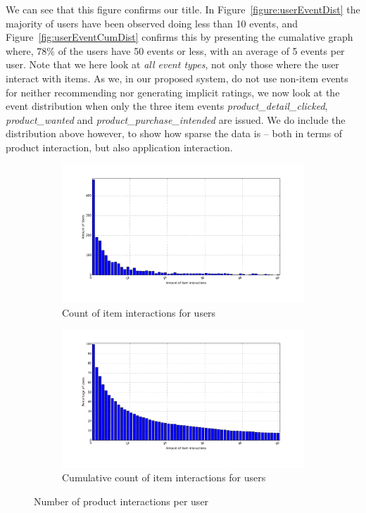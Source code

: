 We can see that this figure confirms our title. In
Figure~\ref{figure:userEventDist} the majority of users have been observed
doing less than 10 events, and Figure~\ref{fig:userEventCumDist} confirms this
by presenting the cumalative graph where, 78\% of the users have 50 events or
less, with an average of 5 events per user. Note that we here look at
\textit{all event types}, not only those where the user interact with items. As
we, in our proposed system, do not use non-item events for neither recommending
nor generating implicit ratings, we now look at the event distribution when
only the three item events \textit{product\_detail\_clicked},
\textit{product\_wanted} and \textit{product\_purchase\_intended} are issued.
We do include the distribution above however, to show how sparse the data is --
both in terms of product interaction, but also application interaction.

\begin{figure}[H]
    \centering
    \begin{subfigure}{.5\textwidth}
        \includegraphics[width=\dualGraphWidth]{image/ratingsPerUserdistribution.png}
        \centering
        \caption{Count of item interactions for users}
        \label{fig:ratingsPerUser}
    \end{subfigure}%
    \begin{subfigure}{.5\textwidth}
        \includegraphics[width=\dualGraphWidth]{image/ratingsPerUsercumdistribution.png}
        \centering
        \caption{Cumulative count of item interactions for users}
        \label{fig:ratingsPerUserCum}
    \end{subfigure}
    \caption{Number of product interactions per user}
\end{figure}


